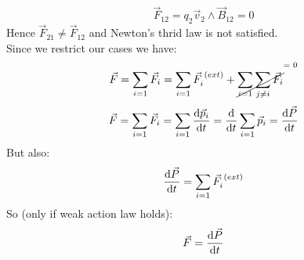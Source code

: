 \begin{equation}
    \vec{F}_{12} = q_2\vec{v}_2\wedge\vec{B}_{12} = 0
\end{equation}
Hence $\vec{F}_{21} \neq \vec{F}_{12}$ and Newton's thrid law is not satisfied.\\
Since we restrict our cases we have:
\begin{equation}
    \vec{F} = \bigsum_{i=1}\vec{F}_i = \bigsum_{i=1}\vec{F}_i^{\;(ext)} + \cancel{\bigsum_{i=1}\bigsum_{j\neq i}\vec{F}_i}\raisebox{14pt}{\scriptsize = 0}
\end{equation}
\begin{equation}
    \vec{F} = \displaystyle\sum_{i=1}\vec{F}_i = \displaystyle\sum_{i=1}\dfrac{\mathrm{d}\vec{p}_i}{\mathrm{d}t} = \dfrac{\mathrm{d}}{\mathrm{d}t}\displaystyle\sum_{i=1}\vec{p}_i = \dfrac{\mathrm{d}\vec{P}}{\mathrm{d}t}
\end{equation}
But also:
\begin{equation}
    \dfrac{\mathrm{d}\vec{P}}{\mathrm{d}t} = \displaystyle\sum_{i=1}\vec{F}_i^{\;(ext)}
\end{equation}
So (only if weak action law holds):
\begin{equation}
    \vec{F} = \dfrac{\mathrm{d}\vec{P}}{\mathrm{d}t}
\end{equation}

